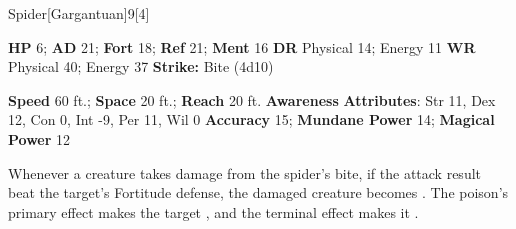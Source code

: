   \begin{monsection}{Spider}[Gargantuan]{9}[4]
    \vspace{-1em}\vspace{-1em}
    \begin{spellcontent}
      \begin{spelltargetinginfo}
        \pari \textbf{HP} 6;
          \textbf{AD} 21;
          \textbf{Fort} 18;
          \textbf{Ref} 21;
          \textbf{Ment} 16
        \pari \textbf{DR} Physical 14; Energy 11
        \pari \textbf{WR} Physical 40; Energy 37
        \pari \textbf{Strike:}
            Bite  (4d10)
      \end{spelltargetinginfo}
    \end{spellcontent}
    \begin{monsterfooter}
      \pari \textbf{Speed} 60 ft.;
        \textbf{Space} 20 ft.;
        \textbf{Reach} 20 ft.
      \pari \textbf{Awareness} 
      \pari \textbf{Attributes}:
        Str 11, Dex 12, Con 0,
        Int -9, Per 11, Wil 0
      \pari \textbf{Accuracy} 15;
        \textbf{Mundane Power} 14;
      \textbf{Magical Power} 12
    \end{monsterfooter}
  \end{monsection}
        Whenever a creature takes damage from the spider's bite,
          if the attack result beat the target's Fortitude defense,
          the damaged creature becomes .
        The poison's primary effect makes the target ,
          and the terminal effect makes it .
  
